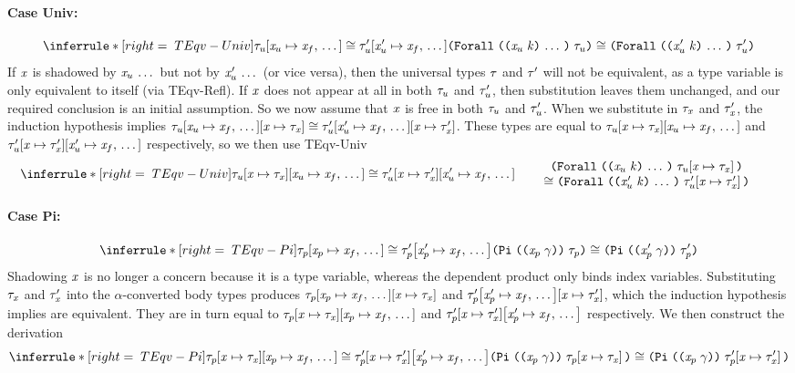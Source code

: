 \begin{sproof}
  \paragraph{Case {\sc Univ}:}
  \[\infr[TEqv-Univ]
  {\teqv
    {\seqsubst{\type_u}{\var_u}{\var_f}}
    {\seqsubst{\type_u'}{\var_u'}{\var_f}}}
  {\teqv
    {\typeuniv{\sequence{\notevar{\var_u}{\kind}}}{\type_u}}
    {\typeuniv{\sequence{\notevar{\var_u'}{\kind}}}{\type_u'}}}\]
  If $\mathit{x}$ is shadowed by $\mathit{x}_u \, \ldots \,$
  but not by $\mathit{x}_u' \, \ldots \,$ (or vice versa),
  then the universal types $\mathit{\tau}$ and $\mathit{\tau}'$ will not be equivalent,
  as a type variable is only equivalent to itself (via {\sc TEqv-Refl}).
  If $\mathit{x}$ does not appear at all in both $\mathit{\tau}_u$ and $\mathit{\tau}_u'$,
  then substitution leaves them unchanged,
  and our required conclusion is an initial assumption.
  So we now assume that $\mathit{x}$ is free in both $\mathit{\tau}_u$ and $\mathit{\tau}_u'$.
  When we substitute in $\mathit{\tau}_{\mathit{x}}$ and $\mathit{\tau}_{\mathit{x}}'$,
  the induction hypothesis implies
  $\mathit{\tau}_u\hspace{-2pt}\left[ \mathit{x}_u \mapsto \mathit{x}_f, \, \ldots \, \right]\hspace{-2pt}\left[ \mathit{x} \mapsto \mathit{\tau}_{\mathit{x}} \right] \cong \mathit{\tau}_u'\hspace{-2pt}\left[ \mathit{x}_u' \mapsto \mathit{x}_f, \, \ldots \, \right]\hspace{-2pt}\left[ \mathit{x} \mapsto \mathit{\tau}_{\mathit{x}}' \right]$.
  These types are equal to
  $\mathit{\tau}_u\hspace{-2pt}\left[ \mathit{x} \mapsto \mathit{\tau}_{\mathit{x}} \right]\hspace{-2pt}\left[ \mathit{x}_u \mapsto \mathit{x}_f, \, \ldots \, \right]$
  and $\mathit{\tau}_u'\hspace{-2pt}\left[ \mathit{x} \mapsto \mathit{\tau}_{\mathit{x}}' \right]\hspace{-2pt}\left[ \mathit{x}_u' \mapsto \mathit{x}_f, \, \ldots \, \right]$ respectively,
  so we then use {\sc TEqv-Univ}
  \[\infr[TEqv-Univ]
  {\teqv
    {\seqsubst{\subst{\type_u}{\var}{\type_{\var}}}{\var_u}{\var_f}}
    {\seqsubst{\subst{\type_u'}{\var}{\type_{\var}'}}{\var_u'}{\var_f}}}
  {\parbox{0.6\textwidth}
    {\centering
      \({\typeuniv{\sequence{\notevar{\var_u}{\kind}}}{\subst{\type_u}{\var}{\type_{\var}}}}\)\\
      \(\teqv{}{}
      {\typeuniv{\sequence{\notevar{\var_u'}{\kind}}}{\subst{\type_u'}{\var}{\type_{\var}'}}}\)}}\]
  \paragraph{Case {\sc Pi}:}
  \[{\infr[TEqv-Pi]
    {\teqv
      {\seqsubst{\type_p}{\var_p}{\var_f}}
      {\seqsubst{\type_p'}{\var_p'}{\var_f}}}
    {\teqv
      {\typedprod{\notevar{\var_p}{\sort}}{\type_p}}
      {\typedprod{\notevar{\var_p'}{\sort}}{\type_p'}}}}\]
  Shadowing $\mathit{x}$ is no longer a concern because
  it is a type variable,
  whereas the dependent product only binds index variables.
  Substituting $\mathit{\tau}_{\mathit{x}}$ and $\mathit{\tau}_{\mathit{x}}'$ into the $\alpha$-converted body types
  produces $\mathit{\tau}_p\hspace{-2pt}\left[ \mathit{x}_p \mapsto \mathit{x}_f, \, \ldots \, \right]\hspace{-2pt}\left[ \mathit{x} \mapsto \mathit{\tau}_{\mathit{x}} \right]$
  and $\mathit{\tau}_p'\hspace{-2pt}\left[ \mathit{x}_p' \mapsto \mathit{x}_f, \, \ldots \, \right]\hspace{-2pt}\left[ \mathit{x} \mapsto \mathit{\tau}_{\mathit{x}}' \right]$,
  which the induction hypothesis implies are equivalent.
  They are in turn equal to
  $\mathit{\tau}_p\hspace{-2pt}\left[ \mathit{x} \mapsto \mathit{\tau}_{\mathit{x}} \right]\hspace{-2pt}\left[ \mathit{x}_p \mapsto \mathit{x}_f, \, \ldots \, \right]$
  and $\mathit{\tau}_p'\hspace{-2pt}\left[ \mathit{x} \mapsto \mathit{\tau}_{\mathit{x}}' \right]\hspace{-2pt}\left[ \mathit{x}_p' \mapsto \mathit{x}_f, \, \ldots \, \right]$
  respectively.
  We then construct the derivation
  \[{\infr[TEqv-Pi]
    {\teqv
      {\seqsubst{\subst{\type_p}{\var}{\type_{\var}}}{\var_p}{\var_f}}
      {\seqsubst{\subst{\type_p'}{\var}{\type_{\var}'}}{\var_p'}{\var_f}}}
    {\teqv
      {\typedprod{\notevar{\var_p}{\sort}}{\subst{\type_p}{\var}{\type_{\var}}}}
      {\typedprod{\notevar{\var_p}{\sort}}{\subst{\type_p'}{\var}{\type_{\var}'}}}}}\]

\end{sproof}
